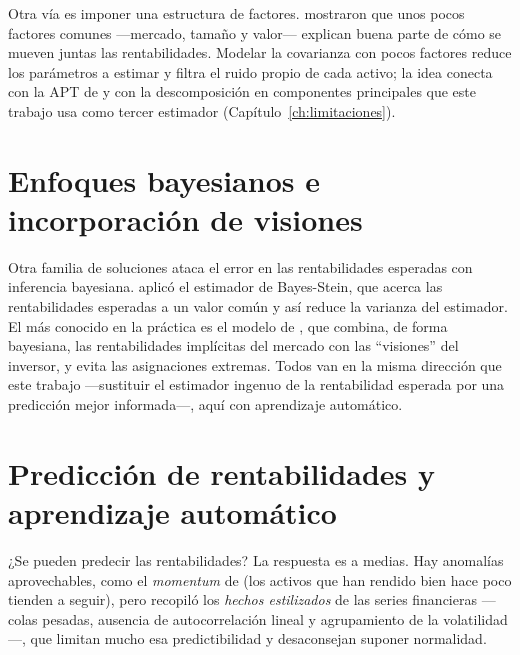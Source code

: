 Otra vía es imponer una estructura de factores. \citet{FamaFrench1993} mostraron
que unos pocos factores comunes ---mercado, tamaño y valor--- explican buena
parte de cómo se mueven juntas las rentabilidades. Modelar la covarianza con
pocos factores reduce los parámetros a estimar y filtra el ruido propio de cada
activo; la idea conecta con la APT de \citet{Ross1976} y con la descomposición en
componentes principales que este trabajo usa como tercer estimador
(Capítulo~\ref{ch:limitaciones}).

\section{Enfoques bayesianos e incorporación de visiones}

Otra familia de soluciones ataca el error en las rentabilidades esperadas con
inferencia bayesiana. \citet{Jorion1986} aplicó el estimador de Bayes-Stein, que
acerca las rentabilidades esperadas a un valor común y así reduce la varianza del
estimador. El más conocido en la práctica es el modelo de
\citet{BlackLitterman1992}, que combina, de forma bayesiana, las rentabilidades
implícitas del mercado con las ``visiones'' del inversor, y evita las
asignaciones extremas. Todos van en la misma dirección que este trabajo
---sustituir el estimador ingenuo de la rentabilidad esperada por una predicción
mejor informada---, aquí con aprendizaje automático.

\section{Predicción de rentabilidades y aprendizaje automático}

¿Se pueden predecir las rentabilidades? La respuesta es a medias. Hay anomalías
aprovechables, como el \textit{momentum} de \citet{Jegadeesh1993} (los activos
que han rendido bien hace poco tienden a seguir), pero \citet{Cont2001} recopiló
los \textit{hechos estilizados} de las series financieras ---colas pesadas,
ausencia de autocorrelación lineal y agrupamiento de la volatilidad---, que
limitan mucho esa predictibilidad y desaconsejan suponer normalidad.

